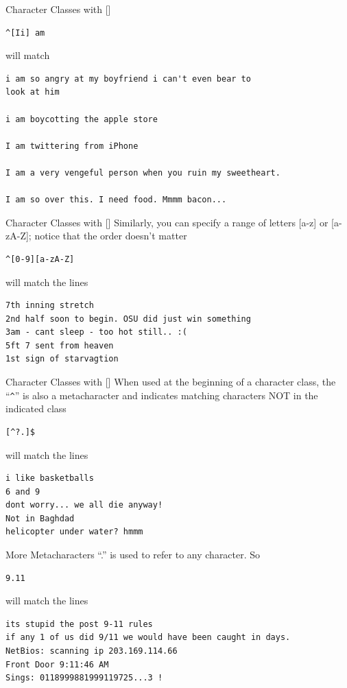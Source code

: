\documentclass{beamer}
\begin{document}
\begin{frame}[fragile]{Character Classes with []}
\begin{verbatim}
^[Ii] am
\end{verbatim}
will match
\begin{verbatim}
i am so angry at my boyfriend i can't even bear to 
look at him

i am boycotting the apple store

I am twittering from iPhone

I am a very vengeful person when you ruin my sweetheart.

I am so over this. I need food. Mmmm bacon...
\end{verbatim}
\end{frame}

\begin{frame}[fragile]{Character Classes with []}
Similarly, you can specify a range of letters [a-z] or 
[a-zA-Z]; notice that the order doesn't matter
\begin{verbatim}
^[0-9][a-zA-Z]
\end{verbatim}
will match the lines 
\begin{verbatim}
7th inning stretch
2nd half soon to begin. OSU did just win something
3am - cant sleep - too hot still.. :(
5ft 7 sent from heaven 
1st sign of starvagtion
\end{verbatim}
\end{frame}

\begin{frame}[fragile]{Character Classes with []}
When used at the beginning of a character class, the ``\verb+^+'' is also a 
metacharacter and indicates matching characters NOT in the 
indicated class
\begin{verbatim}
[^?.]$
\end{verbatim}
will match the lines 
\begin{verbatim}
i like basketballs 
6 and 9
dont worry... we all die anyway! 
Not in Baghdad
helicopter under water? hmmm
\end{verbatim}
\end{frame}

\begin{frame}[fragile]{More Metacharacters}
``.'' is used to refer to any character. So
\begin{verbatim}
9.11
\end{verbatim}
will match the lines 
\begin{verbatim}
its stupid the post 9-11 rules 
if any 1 of us did 9/11 we would have been caught in days.
NetBios: scanning ip 203.169.114.66
Front Door 9:11:46 AM
Sings: 0118999881999119725...3 !
\end{verbatim}
\end{frame}
\end{document}
